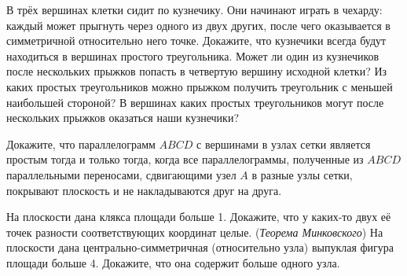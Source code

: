\documentclass[a4paper,11pt]{article}
\begin{document}

В трёх вершинах клетки сидит по кузнечику. Они начинают играть в чехарду:
каждый может прыгнуть через одного из двух других, после чего оказывается в симметричной
относительно него точке.
 Докажите, что кузнечики всегда будут находиться в вершинах простого треугольника.
 Может ли один из кузнечиков после нескольких прыжков попасть в четвертую вершину
исходной клетки?
 Из каких простых треугольников можно прыжком получить треугольник
с меньшей наибольшей стороной?
 В вершинах каких простых треугольников могут после нескольких прыжков оказаться наши кузнечики?





Докажите, что параллелограмм $ABCD$ с вершинами в узлах сетки является
простым тогда и только тогда, когда все %
параллелограммы, полученные из $ABCD$ параллельными переносами,
сдвигающими узел $A$
в разные узлы сетки, покрывают плоскость и не накладываются
друг на друга.

\!\!\!\!\!\!\!\!
На плоскости дана клякса площади больше 1. Докажите, что
у каких-то двух её точек
разности соответствующих координат целые.
 \!\!\!\! ({\it Теорема Минковского})
На плоскости дана центрально-симметричная (относительно узла)
выпуклая фигура площади больше 4. Докажите, что она
содержит больше одного узла.
\end{document}
